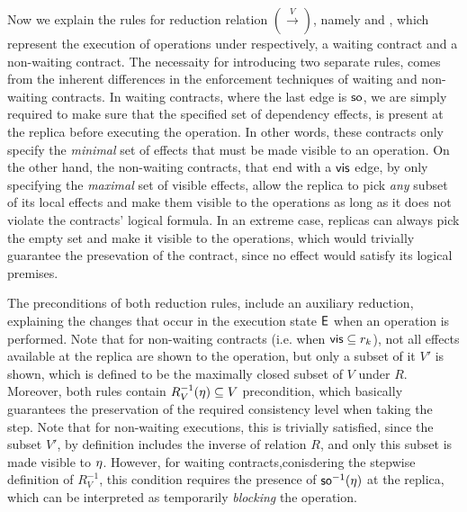 Now we explain the rules for reduction relation $(\xrightarrow{V})$,
namely   and
, which represent the execution of operations
under  respectively, a waiting contract and a non-waiting contract. 
The necessaity for introducing two separate  rules, comes from the
inherent differences in the enforcement techniques of
waiting and non-waiting contracts. In waiting contracts, where the last
edge is ${\normalfont \textsf{so}}$, we are simply required to make sure that the
specified set of dependency effects, is
present at the replica before executing the operation.
In other words, these contracts only specify
the \emph{minimal} set of effects that must be made visible to an
operation. On the other hand, the non-waiting contracts, that end with a
${\normalfont \textsf{vis}}$ edge, by only specifying the \emph{maximal} set of visible
effects, allow the replica to pick \emph{any} subset of its local
effects and make them visible to the operations as long as it does not
violate the contracts' logical formula. In an extreme case, replicas can
always pick the empty set and make it visible to the operations, which
would trivially guarantee the presevation of the contract, since no effect
would satisfy its logical premises.

The preconditions of both reduction rules, include an auxiliary
reduction, explaining the changes that occur in the execution state ${\normalfont \textsf{E}}$
when an operation is performed. Note that for non-waiting contracts
(i.e. when ${\normalfont \textsf{vis}}\subseteq r_k$), 
not all effects available at the replica are shown to the operation, but
only a subset of it $V'$ is shown, which is defined to be the  maximally
closed subset of $V$ under $R$.
Moreover, both rules contain
$R_V^{-1}(\eta)\subseteq V$ precondition, which basically guarantees the
preservation of the required consistency level when taking the step. Note
that for non-waiting executions, this is trivially satisfied, since the
subset $V'$, by definition includes
the inverse of relation $R$, and only this subset is made visible to
$\eta$. However, for waiting contracts,conisdering the stepwise
definition of $R_V^{-1}$, this condition requires the presence of
${\normalfont \textsf{so}}^{-1}(\eta)$ at the replica, which can be
interpreted as temporarily \emph{blocking} the operation.







